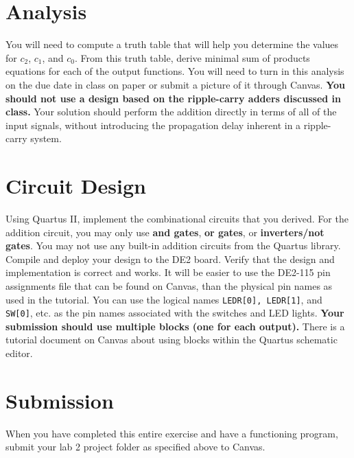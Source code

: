 \documentclass[10pt]{article}
\begin{document}
\section*{Analysis}

You will need to compute a truth table that will help you determine
the values for $c_2$, $c_1$, and $c_0$. From this truth table, derive
minimal sum of products equations for each of the output functions.
You will need to turn in this analysis on the due date in class on
paper or submit a picture of it through Canvas. {\bf You should not use a design based on the ripple-carry
  adders discussed in class.} Your solution should perform the
addition directly in terms of all of the input signals, without
introducing the propagation delay inherent in a ripple-carry system.

\section*{Circuit Design}

Using Quartus II, implement the combinational circuits that you
derived. For the addition circuit, you may only use {\bf and gates}, {\bf or
gates}, or {\bf inverters/not gates}. You may not use any built-in addition circuits
from the Quartus library. Compile and deploy your design to the DE2
board.  Verify that the design and implementation is correct and
works. It will be easier to use the DE2-115 pin assignments file that
can be found on Canvas, than the physical pin names as used in the
tutorial. You can use the logical names {\tt LEDR[0], LEDR[1]}, and
{\tt SW[0]}, etc. as the pin names associated with the switches and
LED lights. {\bf Your submission should use multiple blocks (one for
  each output).} There is a tutorial document on Canvas about using
blocks within the Quartus schematic editor.



\section*{Submission}

When you have completed this entire exercise and have a functioning
program, submit your lab 2 project folder as specified above to Canvas.
\end{document}
